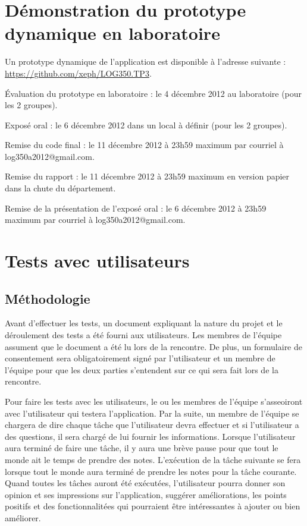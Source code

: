 \documentclass[letterpaper, oneside, 12pt, these, creativecommons]{thETS}
\begin{document}
\chapter{Démonstration du prototype dynamique en laboratoire}

Un prototype dynamique de l'application est disponible à l'adresse suivante : \\
\url{https://github.com/xeph/LOG350.TP3}.

Évaluation du prototype en laboratoire  : le 4 décembre 2012 au laboratoire (pour les 2 groupes).

Exposé oral  : le 6 décembre 2012 dans un local à définir (pour les 2 groupes).

Remise du code final : le 11 décembre 2012 à 23h59 maximum par courriel à log350a2012@gmail.com.

Remise du rapport :  le 11 décembre 2012 à 23h59 maximum en version papier dans la chute du département.

Remise de la présentation de l’exposé oral : le 6 décembre 2012 à 23h59 maximum par courriel à log350a2012@gmail.com.

\chapter{Tests avec utilisateurs}

\section{Méthodologie}

Avant d'effectuer les tests, un document expliquant la nature du projet et le déroulement des tests a été fourni aux utilisateurs. Les membres de l'équipe assument que le document a été lu lors de la rencontre. De plus, un formulaire de consentement sera obligatoirement signé par l'utilisateur et un membre de l'équipe pour que les deux parties s'entendent sur ce qui sera fait lors de la rencontre.

Pour faire les tests avec les utilisateurs, le ou les membres de l'équipe s'asseoiront avec l'utilisateur qui testera l'application. Par la suite, un membre de l'équipe se chargera de dire chaque tâche que l'utilisateur devra effectuer et si l'utilisateur a des questions, il sera chargé de lui fournir les informations. Lorsque l'utilisateur aura terminé de faire une tâche, il y aura une brève pause pour que tout le monde ait le temps de prendre des notes. L'exécution de la tâche suivante se fera lorsque tout le monde aura terminé de prendre les notes pour la tâche courante. Quand toutes les tâches auront été exécutées, l'utilisateur pourra donner son opinion et ses impressions sur l'application, suggérer améliorations, les points positifs et des fonctionnalitées qui pourraient être intéressantes à ajouter ou bien améliorer.
\end{document}
